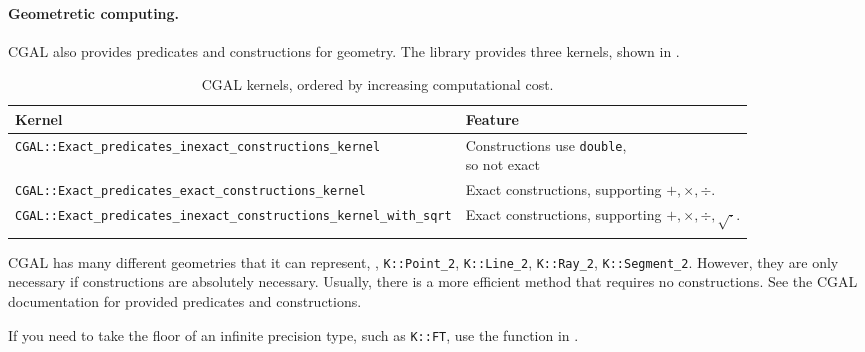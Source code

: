 \documentclass[justified,nobib]{tufte-handout}
\begin{document}
\paragraph{Geometretic computing.}

CGAL also provides predicates and constructions for geometry. The library provides three kernels,
shown in .

\begin{table*}[h]
    \centering
    \caption{CGAL kernels, ordered by increasing computational cost.}
    \label{tab:cgal-kernels}
    \begin{tabular}{ll} \toprule
        Kernel                                                                       & Feature                                         \\
        \midrule
        \texttt{CGAL::Exact\_predicates\_inexact\_constructions\_kernel}             & \makecell[l]{Constructions use \texttt{double}, \\so not exact} \\
        \texttt{CGAL::Exact\_predicates\_exact\_constructions\_kernel}               & \makecell[l]{Exact constructions,               \\supporting $+,\times,\div$.} \\
        \texttt{CGAL::Exact\_predicates\_inexact\_constructions\_kernel\_with\_sqrt} & \makecell[l]{Exact constructions,               \\supporting $+,\times,\div,\sqrt{\cdot}$.} \\
        \bottomrule                                                                                                                    \\
    \end{tabular}
\end{table*}

CGAL has many different geometries that it can represent, \eg, \texttt{K::Point\_2},
\texttt{K::Line\_2}, \texttt{K::Ray\_2}, \texttt{K::Segment\_2}. However, they are only necessary
if constructions are absolutely necessary. Usually, there is a more efficient
method that requires no constructions. See the CGAL documentation for provided predicates and
constructions.

If you need to take the floor of an infinite precision type, such as \texttt{K::FT}, use the
function in .
\end{document}
